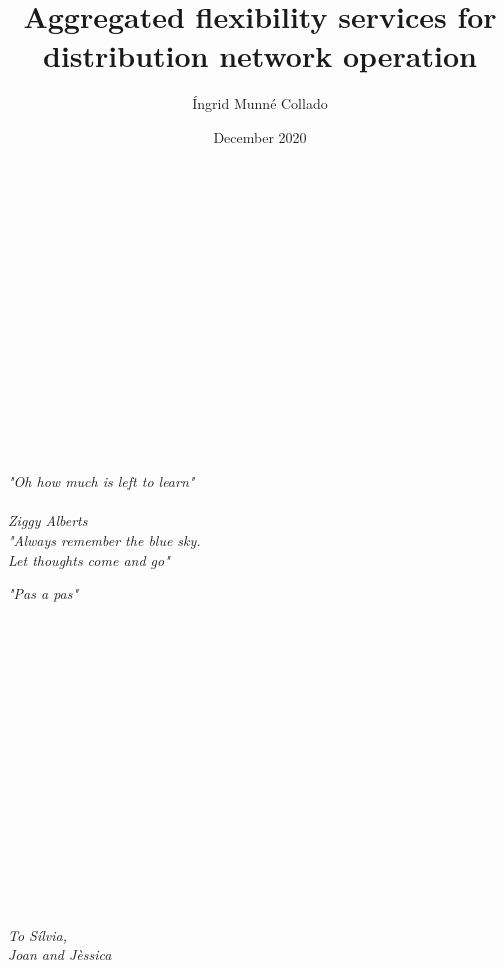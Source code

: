 \documentclass{Classe/PhDCITCEA_web}
\title{Aggregated flexibility services for distribution network operation}
\author{\'Ingrid Munn\'e Collado}
\date{December 2020}
\begin{document}
\cleardoubleemptypage


\maketitle

\cleardoubleemptypage

%

\clearpage
$ $
\\$ $
\\$ $
\\$ $
\\$ $
\\$ $
\\$ $
\\$ $
\\$ $
\\$ $
\\$ $
\\$ $
\\$ $

\begin{Large}
{\raggedleft
\textit{"Oh how much is left to learn"\\ ~ \\ Ziggy Alberts\\}}
\vspace{2cm}
\vspace{2cm}
{\raggedleft
	\textit{"Always remember the blue sky. \\ Let thoughts come and go"\\}}

\vspace{2cm}
{\raggedleft
	\textit{"Pas a pas"\\}}

\end{Large}
\clearpage
$~$
$~$
\clearpage
$ $
\\$ $
\\$ $
\\$ $
\\$ $
\\$ $
\\$ $
\\$ $
\\$ $
\\$ $
\\$ $
\\$ $
\\$ $
\\$ $
\\$ $
\begin{Large}
	{\raggedleft
		\textit{To S\'ilvia,\\ Joan and J\`essica\\}
		}
\end{Large}
\end{document}
